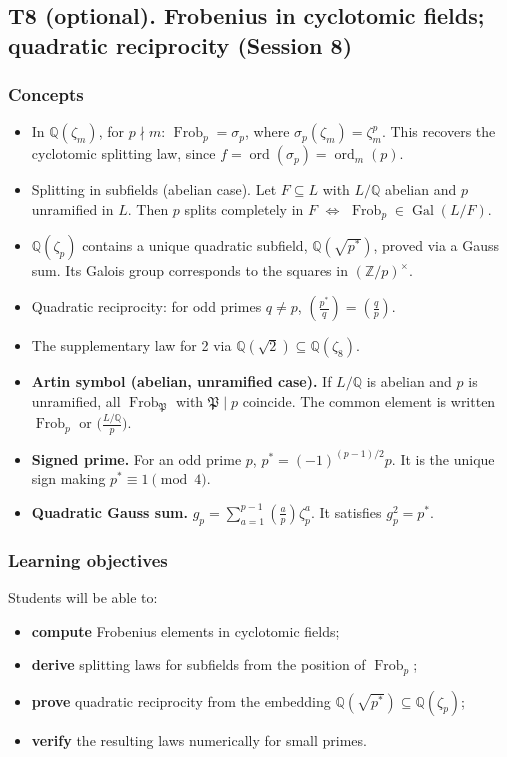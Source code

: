 \documentclass[11pt]{article}
\newcommand{\Z}{\mathbb{Z}}
\newcommand{\Q}{\mathbb{Q}}
\newcommand{\fP}{\mathfrak{P}}
\newcommand{\legendre}[2]{\left(\frac{#1}{#2}\right)}
\DeclareMathOperator{\Gal}{Gal}
\DeclareMathOperator{\Frob}{Frob}
\DeclareMathOperator{\ord}{ord}
\begin{document}
\subsection{T8 (optional). Frobenius in cyclotomic fields; quadratic reciprocity (Session 8)}

\subsubsection*{Concepts}
\begin{itemize}
  \item In $\Q(\zeta_m)$, for $p\nmid m$: $\Frob_p=\sigma_p$, where $\sigma_p(\zeta_m)=\zeta_m^p$. This recovers the cyclotomic splitting law, since $f=\ord(\sigma_p)=\ord_m(p)$.
  \item Splitting in subfields (abelian case). Let $F\subseteq L$ with $L/\Q$ abelian and $p$ unramified in $L$. Then $p$ splits completely in $F$ $\iff$ $\Frob_p\in\Gal(L/F)$.
  \item $\Q(\zeta_p)$ contains a unique quadratic subfield, $\Q(\sqrt{p^*})$, proved via a Gauss sum. Its Galois group corresponds to the squares in $(\Z/p)^\times$.
  \item Quadratic reciprocity: for odd primes $q\neq p$, $\legendre{p^*}{q}=\legendre qp$.
  \item The supplementary law for 2 via $\Q(\sqrt2)\subseteq\Q(\zeta_8)$.
\end{itemize}

\begin{keydefs}
\begin{itemize}
  \item \textbf{Artin symbol (abelian, unramified case).} If $L/\Q$ is abelian and $p$ is unramified, all $\Frob_\fP$ with $\fP\mid p$ coincide. The common element is written $\Frob_p$ or $\bigl(\frac{L/\Q}{p}\bigr)$.
  \item \textbf{Signed prime.} For an odd prime $p$, $p^*=(-1)^{(p-1)/2}p$. It is the unique sign making $p^*\equiv1\pmod4$.
  \item \textbf{Quadratic Gauss sum.} $g_p=\sum_{a=1}^{p-1}\legendre ap\zeta_p^a$. It satisfies $g_p^2=p^*$.
\end{itemize}
\end{keydefs}

\subsubsection*{Learning objectives}
Students will be able to:
\begin{itemize}
  \item \textbf{compute} Frobenius elements in cyclotomic fields;
  \item \textbf{derive} splitting laws for subfields from the position of $\Frob_p$;
  \item \textbf{prove} quadratic reciprocity from the embedding $\Q(\sqrt{p^*})\subseteq\Q(\zeta_p)$;
  \item \textbf{verify} the resulting laws numerically for small primes.
\end{itemize}
\end{document}
